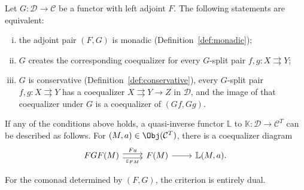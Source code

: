 \begin{theorem}[J.\ M.\ Beck]\label{prop:Beck}
	Let $G:\mathcal{D}\to\mathcal{C}$ be a functor with left adjoint $F$. The
	following statements are equivalent:
	\begin{enumerate}[(i)]
		\item the adjoint pair $(F,G)$ is monadic
		(Definition~\ref{def:monadic});
		\item $G$ creates the corresponding coequalizer for every $G$-split
		pair $f,g:X\rightrightarrows Y$;
		\item $G$ is conservative (Definition~\ref{def:conservative}), every
		$G$-split pair $f,g:X\rightrightarrows Y$ has a coequalizer
		$X\rightrightarrows Y\to Z$ in $\mathcal{D}$, and the image of that
		coequalizer under $G$ is a coequalizer of $(Gf,Gg)$.
	\end{enumerate}

	If any of the conditions above holds, a quasi-inverse functor $\mathbb{L}$
	to $\mathbb{K}:\mathcal{D}\to\mathcal{C}^T$ can be described as follows.
	For $(M,a)\in\Obj(\mathcal{C}^T)$, there is a coequalizer diagram
	\begin{equation}\label{eqn:Beck-aux1}\begin{tikzcd}
		FGF(M) \arrow[shift left, r, "Fa"] \arrow[shift right, r, "\varepsilon_{FM}"'] & F(M) \arrow[r] & \mathbb{L}(M, a).
	\end{tikzcd}\end{equation}

	For the comonad determined by $(F,G)$, the criterion is entirely dual.
\end{theorem}
